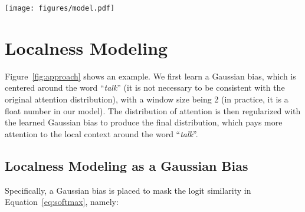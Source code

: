 \documentclass[11pt,a4paper]{article}
\begin{document}
\fi

\begin{figure*}[ht]
\begin{center}
\texttt{[image: figures/model.pdf]}
\caption{
\label{fig:approach}
Illustration of the proposed approach. In this example, window size of 2 is used ().
}
\end{center}
\end{figure*} 



\section{Localness Modeling}


\iffalse
From a linguistic intuition, when a word  is aligned to another word , we also expect  to align mainly to the neighboring words of , so as to capture phrasal patterns that contain useful local context information. However, since the conventional self-attention models consider all of the words in a sequence, the weighted averaging inhibits the relation among neighboring words especially for a long sequence.
In addition, as a pivotal component of self-attention model, the motivation of multi-head mechanism aims at allowing the model to jointly attend to information from different representation subspaces. However, we argue that adopting global attention may impair the benefit from the multi-head model.  
\fi



Figure~\ref{fig:approach} shows an example. We first learn a Gaussian bias, which is centered around the word ``{\em talk}'' (it is not necessary to be consistent with the original attention distribution), with a window size being 2 (in practice, it is a float number in our model). 
The distribution of attention is then regularized with the learned Gaussian bias to produce the final distribution, which pays more  
attention to the local context around the word ``{\em talk}''.



\iffalse
Contrast to \cite{luong2015effective} who applied {\em local attention} into vanilla attention model with a fixed window size, we introduce more effective and flexible strategies for the predicting the local scope of self-attention model.
\fi



\subsection{\bf Localness Modeling as a Gaussian Bias}
\label{sec:gaussian}
Specifically, a  Gaussian bias  is placed to mask the logit similarity  in Equation~\ref{eq:softmax}, namely:
\end{document}
